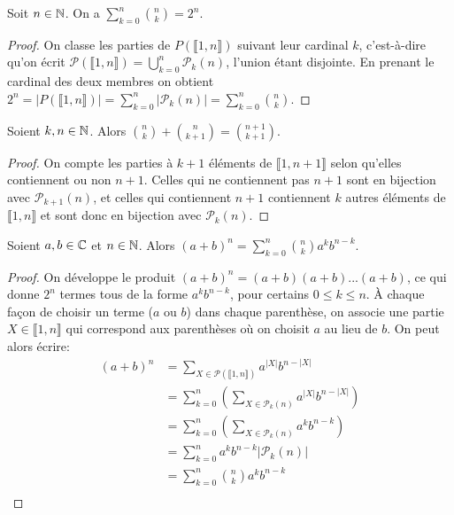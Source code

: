 \begin{proposition}
Soit $n\in\mathbb{N}$. On a $\sum_{k=0}^n \binom{n}{k} =2^n$.
\end{proposition}
\begin{proof}
On classe les parties de $P(\llbracket 1,n\rrbracket)$ suivant leur cardinal $k$, c'est-à-dire qu'on écrit  $\mathcal P(\llbracket 1,n\rrbracket) = \bigcup_{k=0}^n \mathcal P_k(n)$, l'union étant disjointe. En prenant le cardinal des deux membres on obtient $2^n=|P(\llbracket 1,n\rrbracket)| = \sum_{k=0}^n |\mathcal P_k(n)| = \sum_{k=0}^n \binom{n}{k}$.
\end{proof}

\begin{proposition}
Soient $k,n\in \mathbb{N}$. Alors $\binom{n}{k}+\binom{n}{k+1} = \binom{n+1}{k+1}$.
\end{proposition}
\begin{proof}
On compte les parties à $k+1$ éléments de $\llbracket 1,n+1\rrbracket$ selon qu'elles contiennent ou non $n+1$. Celles qui ne contiennent pas $n+1$ sont en bijection avec $\mathcal P_{k+1}(n)$, et celles qui contiennent $n+1$ contiennent $k$ autres éléments de $\llbracket 1,n\rrbracket$ et sont donc en bijection avec $\mathcal P_k(n)$.
\end{proof}

\begin{proposition}
Soient $a, b\in \mathbb{C}$ et $n\in \mathbb{N}$. Alors $(a+b)^n = \sum_{k=0}^n \binom{n}{k} a^k b^{n-k}$.
\end{proposition}
\begin{proof}
On développe le produit $(a+b)^n = (a+b)(a+b)...(a+b)$, ce qui donne $2^n$ termes tous de la forme $a^kb^{n-k}$, pour certains $0\leq k\leq n$.
À chaque façon de choisir un terme ($a$ ou $b$) dans chaque parenthèse, on associe une partie $X \in \llbracket 1,n\rrbracket$ qui correspond aux parenthèses où on choisit $a$ au lieu de $b$. On peut alors écrire:
\begin{align*}
(a+b)^n
&= \sum_{X \in \mathcal P(\llbracket 1,n\rrbracket)} a^{|X|}b^{n-|X|}\\
&= \sum_{k=0}^n \left(\sum_{X\in\mathcal P_k(n)} a^{|X|}b^{n-|X|}\right)\\
&= \sum_{k=0}^n \left( \sum_{X\in\mathcal P_k(n)} a^k b^{n-k}\right)\\
&= \sum_{k=0}^n a^kb^{n-k} \left|\mathcal P_k(n)\right|\\
&= \sum_{k=0}^n \binom{n}{k}a^kb^{n-k}\\
\end{align*}
\end{proof}

